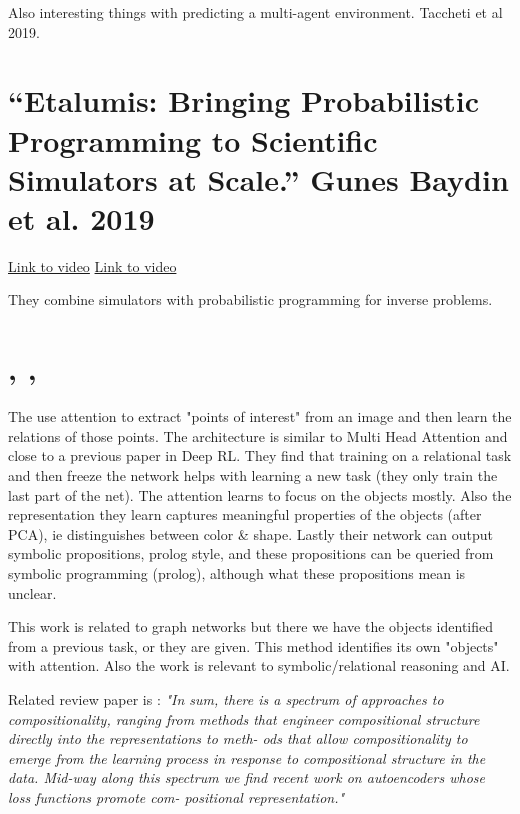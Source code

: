 \documentclass{article}
\newcommand{\citeall}[1]{\citeauthor{#1}, \citetitle{#1}, \citeyear{#1}}
\begin{document}
Also interesting things with predicting a multi-agent environment. Taccheti et al 2019.

\section{“Etalumis: Bringing Probabilistic Programming to Scientific Simulators at Scale.” Gunes Baydin et al. 2019}

\href{https://www.youtube.com/watch?v=aCh_n2yzSRc}{Link to video}
\href{http://www.ipam.ucla.edu/abstract/?tid=16191}{Link to video}

They combine simulators with probabilistic programming for inverse problems. 

\section{\citeall{Shanahan2019AnArchitecture}}

The use attention to extract "points of interest" from an image and then learn the relations of those points. The architecture is similar to Multi Head Attention \cite{Vaswani2017AttentionNeed} and close to a previous paper in Deep RL. They find that training on a relational task and then freeze the network helps with learning a new task (they only train the last part of the net). The attention learns to focus on the objects mostly. Also the representation they learn captures meaningful properties of the objects (after PCA), ie distinguishes between color & shape. Lastly their network can output symbolic propositions, prolog style, and these propositions can be queried from symbolic programming (prolog), although what these propositions mean is unclear. 

This work is related to graph networks but there we have the objects identified from a previous task, or they are given. This method identifies its own "objects" with attention. Also the work is relevant to symbolic/relational reasoning and AI.

Related review paper is \cite{Garnelo2019ReconcilingRelations}:
\textit{"In sum, there is a spectrum of approaches to compositionality, ranging from methods that engineer compositional structure directly into the representations to meth- ods that allow compositionality to emerge from the learning process in response to compositional structure in the data. Mid-way along this spectrum we find recent work on autoencoders whose loss functions promote com- positional representation."}
\end{document}
